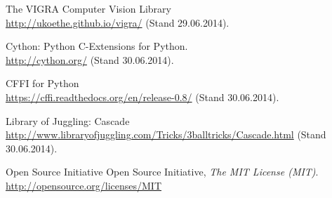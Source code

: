 \documentclass[12pt,a4paper,ngerman]{scrartcl}
\begin{document}
\begin{thebibliography}{99}
The VIGRA Computer Vision Library\\
\url{http://ukoethe.github.io/vigra/} (Stand 29.06.2014).

Cython: Python C-Extensions for Python.\\
\url{http://cython.org/} (Stand 30.06.2014).

CFFI for Python\\
\url{https://cffi.readthedocs.org/en/release-0.8/} (Stand 30.06.2014).

Library of Juggling: Cascade\\
\url{http://www.libraryofjuggling.com/Tricks/3balltricks/Cascade.html} (Stand 30.06.2014).

Open Source Initiative Open Source Initiative,
\emph{The MIT License (MIT)}.
\url{http://opensource.org/licenses/MIT}
\end{thebibliography}
\end{document}
